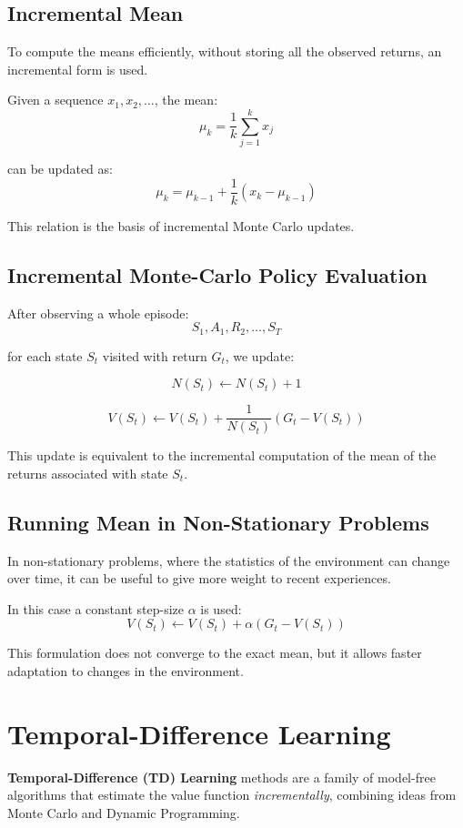 \subsection{Incremental Mean}

To compute the means efficiently, without storing all the observed returns,
an incremental form is used.

Given a sequence $x_1, x_2, \dots$, the mean:
\[
\mu_k = \frac{1}{k} \sum_{j=1}^{k} x_j
\]

can be updated as:
\[
\mu_k
=
\mu_{k-1}
+
\frac{1}{k}
\left(
x_k - \mu_{k-1}
\right)
\]

This relation is the basis of incremental Monte Carlo updates.

\subsection{Incremental Monte-Carlo Policy Evaluation}

After observing a whole episode:
\[
S_1, A_1, R_2, \dots, S_T
\]

for each state $S_t$ visited with return $G_t$, we update:

\[
N(S_t) \leftarrow N(S_t) + 1
\]

\[
V(S_t)
\leftarrow
V(S_t)
+
\frac{1}{N(S_t)}
\left(
G_t - V(S_t)
\right)
\]

\noindent
This update is equivalent to the incremental computation of the mean of the returns
associated with state $S_t$.

\subsection{Running Mean in Non-Stationary Problems}

In non-stationary problems, where the statistics of the environment can change over time,
it can be useful to give more weight to recent experiences.

In this case a constant step-size $\alpha$ is used:
\[
V(S_t)
\leftarrow
V(S_t)
+
\alpha
\left(
G_t - V(S_t)
\right)
\]

\noindent
This formulation does not converge to the exact mean, but it allows
faster adaptation to changes in the environment.

\section{Temporal-Difference Learning}

\textbf{Temporal-Difference (TD) Learning} methods are a family of
model-free algorithms that estimate the value function \textit{incrementally}, combining
ideas from Monte Carlo and Dynamic Programming.

